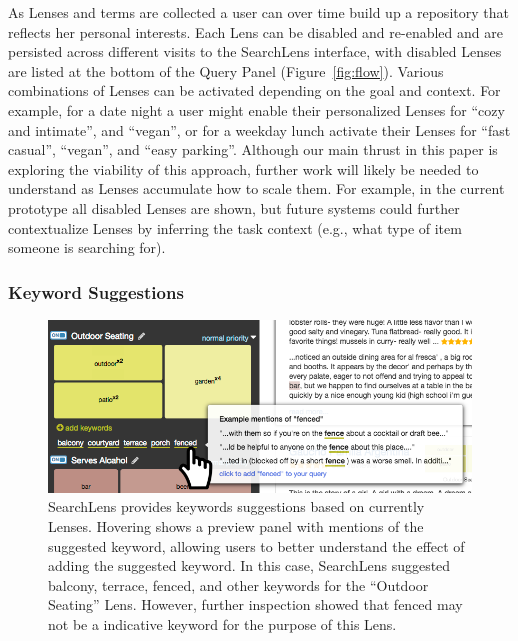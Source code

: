 \documentclass{sigchi}
\begin{document}
As Lenses and terms are collected a user can over time build up a repository that reflects her personal interests. Each Lens can be disabled and re-enabled and are persisted across different visits to the SearchLens interface, with disabled Lenses are listed at the bottom of the Query Panel (Figure~\ref{fig:flow}). Various combinations of Lenses can be activated depending on the goal and context. For example, for a date night a user might enable their personalized Lenses for ``cozy and intimate'', and ``vegan'', or for a weekday lunch activate their Lenses for ``fast casual'', ``vegan'', and ``easy parking''. Although our main thrust in this paper is exploring the viability of this approach, further work will likely be needed to understand as Lenses accumulate how to scale them. For example, in the current prototype all disabled Lenses are shown, but future systems could further contextualize Lenses by inferring the task context (e.g., what type of item someone is searching for). %



\subsubsection{Keyword Suggestions}

\begin{figure}[]
    \centering
    \includegraphics[width=1\columnwidth]{figures/suggestions.png}
    \caption{SearchLens provides keywords suggestions based on currently Lenses. Hovering shows a preview panel with mentions of the suggested keyword, allowing users to better understand the effect of adding the suggested keyword. In this case, SearchLens suggested balcony, terrace, fenced, and other keywords for the ``Outdoor Seating'' Lens. However, further inspection showed that fenced may not be a indicative keyword for the purpose of this Lens.}
    \label{fig:suggestion}
\end{figure}
\end{document}
